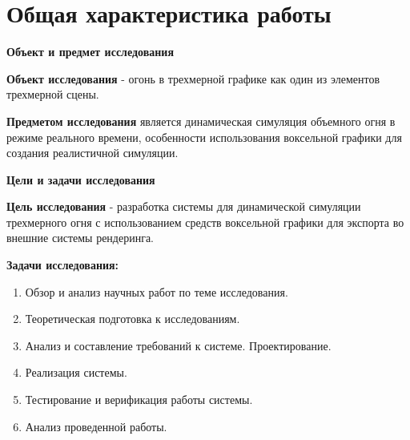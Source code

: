 \part*{Общая характеристика работы}

\textbf{Объект и предмет исследования}

\textbf{Объект исследования} - огонь в трехмерной графике как один из элементов
трехмерной сцены.

\textbf{Предметом исследования} является динамическая симуляция объемного огня в
режиме реального времени, особенности использования воксельной графики для
создания реалистичной симуляции.

\textbf{Цели и задачи исследования}

\textbf{Цель исследования} - разработка системы для динамической симуляции
трехмерного огня с использованием средств воксельной графики для экспорта во
внешние системы рендеринга.

\textbf{Задачи исследования:}

\begin{enumerate}
	\item Обзор и анализ научных работ по теме исследования.
	\item Теоретическая подготовка к исследованиям.
	\item Анализ и составление требований к системе. Проектирование.
	\item Реализация системы.
	\item Тестирование и верификация работы системы.
	\item Анализ проведенной работы.
\end{enumerate}
